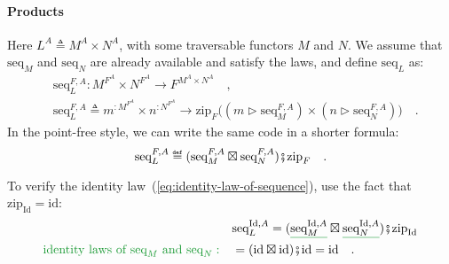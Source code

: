 \paragraph{Products}

Here $L^{A}\triangleq M^{A}\times N^{A}$, with some traversable functors
$M$ and $N$. We assume that $\text{seq}_{M}$ and $\text{seq}_{N}$
are already available and satisfy the laws, and define $\text{seq}_{L}$
as:
\begin{align*}
 & \text{seq}_{L}^{F,A}:M^{F^{A}}\times N^{F^{A}}\rightarrow F^{M^{A}\times N^{A}}\quad,\\
 & \text{seq}_{L}^{F,A}\triangleq m^{:M^{F^{A}}}\times n^{:N^{F^{A}}}\rightarrow\text{zip}_{F}\big((m\triangleright\text{seq}_{M}^{F,A})\times(n\triangleright\text{seq}_{N}^{F,A})\big)\quad.
\end{align*}
In the point-free style, we can write the same code in a shorter formula:
\[
\text{seq}_{L}^{F,A}\triangleq(\text{seq}_{M}^{F,A}\boxtimes\text{seq}_{N}^{F,A})\bef\text{zip}_{F}\quad.
\]

To verify the identity law~(\ref{eq:identity-law-of-sequence}),
use the fact that $\text{zip}_{\text{Id}}=\text{id}$:
\begin{align*}
 & \text{seq}_{L}^{\text{Id},A}=(\gunderline{\text{seq}_{M}^{\text{Id},A}}\boxtimes\gunderline{\text{seq}_{N}^{\text{Id},A}})\bef\text{zip}_{\text{Id}}\\
{\color{greenunder}\text{identity laws of }\text{seq}_{M}\text{ and }\text{seq}_{N}:}\quad & =(\text{id}\boxtimes\text{id})\bef\text{id}=\text{id}\quad.
\end{align*}

